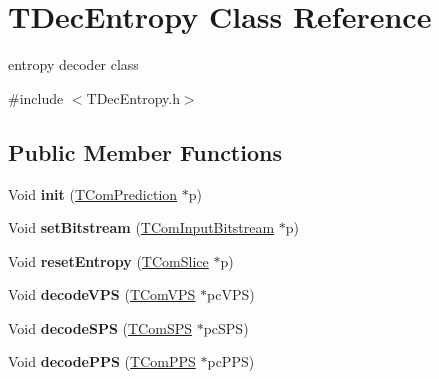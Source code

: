 \hypertarget{class_t_dec_entropy}{}\section{T\+Dec\+Entropy Class Reference}
\label{class_t_dec_entropy}


entropy decoder class  




{\ttfamily \#include $<$T\+Dec\+Entropy.\+h$>$}

\subsection*{Public Member Functions}
\begin{DoxyCompactItemize}
\item 
\mbox{\label{class_t_dec_entropy_adda104a85bc0d3c3fb6e3fef0a132440}} 
Void {\bfseries init} (\hyperlink{class_t_com_prediction}{T\+Com\+Prediction} $\ast$p)
\item 
\mbox{\label{class_t_dec_entropy_a7a17d1d07d883847bbba4fcdf2931e60}} 
Void {\bfseries set\+Bitstream} (\hyperlink{class_t_com_input_bitstream}{T\+Com\+Input\+Bitstream} $\ast$p)
\item 
\mbox{\label{class_t_dec_entropy_a0692782dc55821027d53c81564058280}} 
Void {\bfseries reset\+Entropy} (\hyperlink{class_t_com_slice}{T\+Com\+Slice} $\ast$p)
\item 
\mbox{\label{class_t_dec_entropy_a036cbea3e674c5d73fe948243f71350b}} 
Void {\bfseries decode\+V\+PS} (\hyperlink{class_t_com_v_p_s}{T\+Com\+V\+PS} $\ast$pc\+V\+PS)
\item 
\mbox{\label{class_t_dec_entropy_af21225ef60690c1f8386485acce478a3}} 
Void {\bfseries decode\+S\+PS} (\hyperlink{class_t_com_s_p_s}{T\+Com\+S\+PS} $\ast$pc\+S\+PS)
\item 
\mbox{\label{class_t_dec_entropy_a13e1b7b75f7224b83cb93dd165115291}} 
Void {\bfseries decode\+P\+PS} (\hyperlink{class_t_com_p_p_s}{T\+Com\+P\+PS} $\ast$pc\+P\+PS)
\item 
\mbox{\label{class_t_dec_entropy_a63dbfb111335e061270c7c0e615d7244}} 

\end{DoxyCompactItemize}
